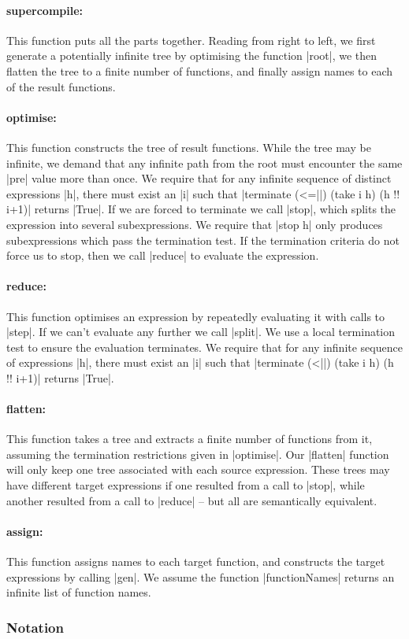 \documentclass[draft]{sigplanconf}
\begin{document}
\newcommand{\function}[1]{\paragraph{\textsf{#1:}}\hspace{-3mm}}

\function{supercompile} This function puts all the parts together. Reading from right to left, we first generate a potentially infinite tree by optimising the function |root|, we then flatten the tree to a finite number of functions, and finally assign names to each of the result functions.

\function{optimise} This function constructs the tree of result functions. While the tree may be infinite, we demand that any infinite path from the root must encounter the same |pre| value more than once. We require that for any infinite sequence of distinct expressions |h|, there must exist an |i| such that |terminate (<=||) (take i h) (h !! i+1)| returns |True|. If we are forced to terminate we call |stop|, which splits the expression into several subexpressions. We require that |stop h| only produces subexpressions which pass the termination test. If the termination criteria do not force us to stop, then we call |reduce| to evaluate the expression.

\function{reduce} This function optimises an expression by repeatedly evaluating it with calls to |step|. If we can't evaluate any further we call |split|. We use a local termination test to ensure the evaluation terminates. We require that for any infinite sequence of expressions |h|, there must exist an |i| such that |terminate (<||) (take i h) (h !! i+1)| returns |True|.

\function{flatten} This function takes a tree and extracts a finite number of functions from it, assuming the termination restrictions given in |optimise|. Our |flatten| function will only keep one tree associated with each source expression. These trees may have different target expressions if one resulted from a call to |stop|, while another resulted from a call to |reduce| -- but all are semantically equivalent.

\function{assign} This function assigns names to each target function, and constructs the target expressions by calling |gen|. We assume the function |functionNames| returns an infinite list of function names.

\subsubsection{Notation}
\label{sec:child_notation}
\end{document}
